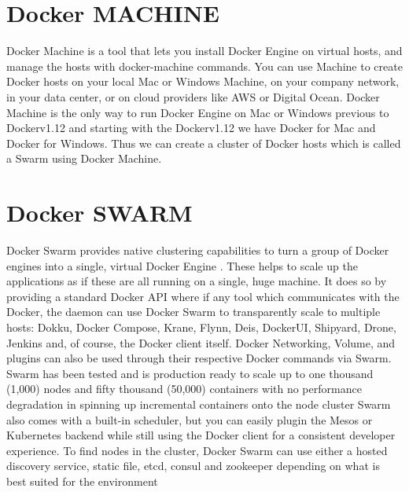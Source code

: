\documentclass[9pt,twocolumn,twoside]{../../styles/osajnl}
\begin{document}
\section{Docker MACHINE}

Docker Machine is a tool that lets you install Docker Engine on
virtual hosts, and manage the hosts with docker-machine
commands\cite{www-docker-machine}. You can use Machine to create
Docker hosts on your local Mac or Windows Machine, on your company
network, in your data center, or on cloud providers like AWS or
Digital Ocean. Docker Machine is the only way to run Docker Engine on
Mac or Windows previous to Dockerv1.12 and starting with the
Dockerv1.12 we have Docker for Mac and Docker for Windows. Thus we can
create a cluster of Docker hosts which is called a Swarm using Docker
Machine.

\section{Docker SWARM}
Docker Swarm provides native clustering capabilities to turn a group
of Docker engines into a single, virtual Docker
Engine \cite{www-docker-swarm}. These helps to scale up the
applications as if these are all running on a single, huge machine. It
does so by providing a standard Docker API where if any tool which
communicates with the Docker, the daemon can use Docker Swarm to
transparently scale to multiple hosts: Dokku, Docker Compose, Krane,
Flynn, Deis, DockerUI, Shipyard, Drone, Jenkins and, of course, the
Docker client itself.  Docker Networking, Volume, and plugins can also
be used through their respective Docker commands via Swarm. Swarm has
been tested and is production ready to scale up to one thousand
(1,000) nodes and fifty thousand (50,000) containers with no
performance degradation in spinning up incremental containers onto the
node cluster Swarm also comes with a built-in scheduler, but you can
easily plugin the Mesos or Kubernetes backend while still using the
Docker client for a consistent developer experience. To find nodes in
the cluster, Docker Swarm can use either a hosted discovery service,
static file, etcd, consul and zookeeper depending on what is best
suited for the environment \cite{www-docker-machine}
\end{document}
